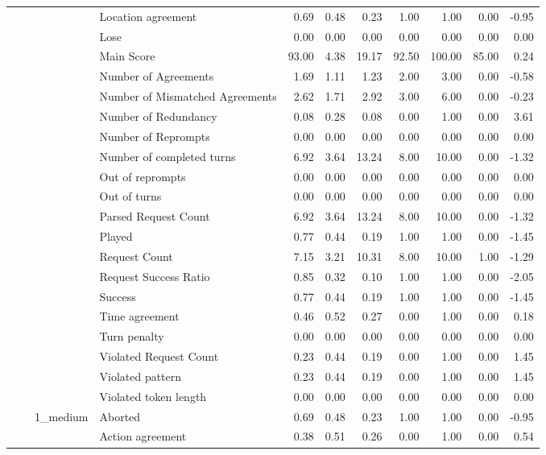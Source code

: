 \begin{tabular}{llllrrrrrrr}
 &  &  & Location agreement & 0.69 & 0.48 & 0.23 & 1.00 & 1.00 & 0.00 & -0.95 \\
 &  &  & Lose & 0.00 & 0.00 & 0.00 & 0.00 & 0.00 & 0.00 & 0.00 \\
 &  &  & Main Score & 93.00 & 4.38 & 19.17 & 92.50 & 100.00 & 85.00 & 0.24 \\
 &  &  & Number of Agreements & 1.69 & 1.11 & 1.23 & 2.00 & 3.00 & 0.00 & -0.58 \\
 &  &  & Number of Mismatched Agreements & 2.62 & 1.71 & 2.92 & 3.00 & 6.00 & 0.00 & -0.23 \\
 &  &  & Number of Redundancy & 0.08 & 0.28 & 0.08 & 0.00 & 1.00 & 0.00 & 3.61 \\
 &  &  & Number of Reprompts & 0.00 & 0.00 & 0.00 & 0.00 & 0.00 & 0.00 & 0.00 \\
 &  &  & Number of completed turns & 6.92 & 3.64 & 13.24 & 8.00 & 10.00 & 0.00 & -1.32 \\
 &  &  & Out of reprompts & 0.00 & 0.00 & 0.00 & 0.00 & 0.00 & 0.00 & 0.00 \\
 &  &  & Out of turns & 0.00 & 0.00 & 0.00 & 0.00 & 0.00 & 0.00 & 0.00 \\
 &  &  & Parsed Request Count & 6.92 & 3.64 & 13.24 & 8.00 & 10.00 & 0.00 & -1.32 \\
 &  &  & Played & 0.77 & 0.44 & 0.19 & 1.00 & 1.00 & 0.00 & -1.45 \\
 &  &  & Request Count & 7.15 & 3.21 & 10.31 & 8.00 & 10.00 & 1.00 & -1.29 \\
 &  &  & Request Success Ratio & 0.85 & 0.32 & 0.10 & 1.00 & 1.00 & 0.00 & -2.05 \\
 &  &  & Success & 0.77 & 0.44 & 0.19 & 1.00 & 1.00 & 0.00 & -1.45 \\
 &  &  & Time agreement & 0.46 & 0.52 & 0.27 & 0.00 & 1.00 & 0.00 & 0.18 \\
 &  &  & Turn penalty & 0.00 & 0.00 & 0.00 & 0.00 & 0.00 & 0.00 & 0.00 \\
 &  &  & Violated Request Count & 0.23 & 0.44 & 0.19 & 0.00 & 1.00 & 0.00 & 1.45 \\
 &  &  & Violated pattern & 0.23 & 0.44 & 0.19 & 0.00 & 1.00 & 0.00 & 1.45 \\
 &  &  & Violated token length & 0.00 & 0.00 & 0.00 & 0.00 & 0.00 & 0.00 & 0.00 \\
\cline{3-11}
 &  & \multirow[t]{27}{*}{1_medium} & Aborted & 0.69 & 0.48 & 0.23 & 1.00 & 1.00 & 0.00 & -0.95 \\
 &  &  & Action agreement & 0.38 & 0.51 & 0.26 & 0.00 & 1.00 & 0.00 & 0.54 \\

\end{tabular}
